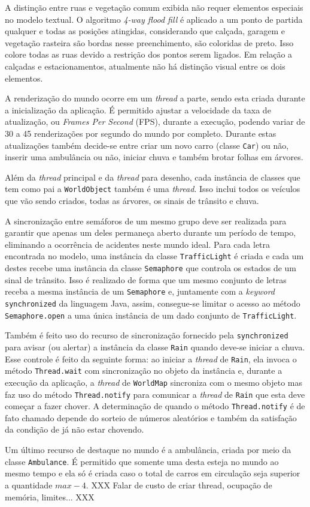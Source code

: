 A distinção entre ruas e vegetação comum exibida não requer elementos
especiais no modelo textual. O algoritmo \textit{4-way flood fill} é
aplicado a um ponto de partida qualquer e todas as posições atingidas,
considerando que calçada, garagem e vegetação rasteira são bordas
nesse preenchimento, são coloridas de preto. Isso colore todas as ruas
devido a restrição dos pontos serem ligados. Em relação a calçadas e
estacionamentos, atualmente não há distinção visual entre os dois
elementos.

A renderização do mundo ocorre em um \textit{thread} a parte, sendo
esta criada durante a inicialização da aplicação. É permitido ajustar
a velocidade da taxa de atualização, ou \textit{Frames Per Second} (FPS),
durante a execução, podendo variar de 30 a 45 renderizações por
segundo do mundo por completo. Durante estas atualizações também
decide-se entre criar um novo carro (classe \verb!Car!) ou não,
inserir uma ambulância ou não, iniciar chuva e também brotar folhas em
árvores.

Além da \textit{thread} principal e da \textit{thread} para desenho,
cada instância de classes que tem como pai a \verb!WorldObject! também
é uma \textit{thread}. Isso inclui todos os veículos que vão sendo
criados, todas as árvores, os sinais de trânsito e chuva.

A sincronização entre semáforos de um mesmo grupo deve ser realizada
para garantir que apenas um deles permaneça aberto durante um período
de tempo, eliminando a ocorrência de acidentes neste mundo ideal. Para
cada letra encontrada no modelo, uma instância da classe
\verb!TrafficLight! é criada e cada um destes recebe uma instância da
classe \verb!Semaphore! que controla os estados de um sinal de
trânsito. Isso é realizado de forma que um mesmo conjunto de letras
receba a mesma instância de um \verb!Semaphore! e, juntamente com a
\textit{keyword} \verb!synchronized! da linguagem Java, assim,
consegue-se limitar o acesso ao método \verb!Semaphore.open! a uma
única instância de um dado conjunto de \verb!TrafficLight!.

Também é feito uso do recurso de sincronização fornecido pela
\verb!synchronized! para avisar (ou alertar) a instância da classe
\verb!Rain! quando deve-se iniciar a chuva. Esse controle é feito da
seguinte forma: ao iniciar a \textit{thread} de \verb!Rain!, ela
invoca o método \verb!Thread.wait! com sincronização no objeto da
instância e, durante a execução da aplicação, a \textit{thread} de
\verb!WorldMap! sincroniza com o mesmo objeto mas faz uso do método
\verb!Thread.notify! para comunicar a \textit{thread} de \verb!Rain!
que esta deve começar a fazer chover. A determinação de quando o
método \verb!Thread.notify! é de fato chamado depende do sorteio de
números aleatórios e também da satisfação da condição de já não estar
chovendo.

Um último recurso de destaque no mundo é a ambulância, criada por meio
da classe \verb!Ambulance!. É permitido que somente uma desta esteja
no mundo ao mesmo tempo e ela só é criada caso o total de carros em
circulação seja superior a quantidade $max - 4$. XXX Falar de custo de
criar thread, ocupação de memória, limites... XXX
